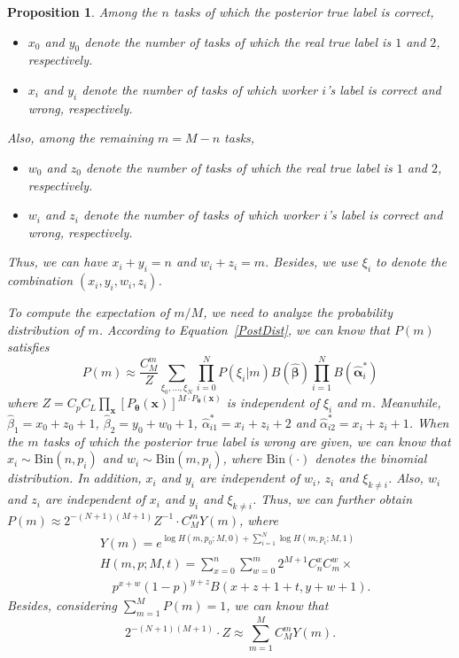 \documentclass{article}
\makeatletter
\newtheorem{proposition}[theorem]{Proposition}
\renewenvironment{proof}[1][\proofname]{\par
  \vspace{-\topsep}%
  \pushQED{\qed}%
  \normalfont
  \topsep0pt \partopsep0pt %
  \trivlist
  \item[\hskip\labelsep
        \itshape
    #1\@addpunct{.}]\ignorespaces
}{%
  \popQED\endtrivlist\@endpefalse
  \addvspace{0pt plus 0pt} %
}
\makeatother
\begin{document}
\begin{proposition}
\begin{proof}
Among the $n$ tasks of which the posterior true label is correct,
\begin{itemize}[noitemsep,topsep=0pt]
\item $x_0$ and $y_0$ denote the number of tasks of which the real true label is $1$ and $2$, respectively.
\item $x_i$ and $y_i$ denote the number of tasks of which worker $i$'s label is correct and wrong, respectively.
\end{itemize}
Also, among the remaining $m=M-n$ tasks, 
\begin{itemize}[noitemsep,topsep=0pt]
\item $w_0$ and $z_0$ denote the number of tasks of which the real true label is $1$ and $2$, respectively.
\item $w_i$ and $z_i$ denote the number of tasks of which worker $i$'s label is correct and wrong, respectively.
\end{itemize}
Thus, we can have $x_i+y_i=n$ and $w_i+z_i=m$. Besides, we use $\xi_i$ to denote the combination $(x_i,y_i,w_i, z_i)$.

To compute the expectation of $m/M$, we need to analyze the probability distribution of $m$. According to Equation~\ref{PostDist}, we can know that $P(m)$ satisfies
\begin{equation}
P(m) \approx \frac{C_{M}^{m}}{Z} \sum_{\xi_0,\ldots, \xi_N}\prod_{i=0}^{N}P(\xi_i|m) B(\hat{\bm{\beta}})\prod_{i=1}^{N}B(\hat{\bm{\alpha}}^{*}_{i})
\end{equation}
where $Z=C_pC_L{\prod}_{\bm{x}} [P_{\bm{\theta}}(\bm{x})]^{M\cdot P_{\bm{\theta}}(\bm{x})}$ is independent of $\xi_i$ and $m$.
Meanwhile, $\hat{\beta}_1=x_0+z_0+1$, $\hat{\beta}_2=y_0+w_0+1$, $\hat{\alpha}_{i1}^{*}=x_i+z_i+2$ and $\hat{\alpha}_{i2}^{*}=x_i+z_i+1$.
When the $m$ tasks of which the posterior true label is wrong are given, we can know that $x_i\sim \mathrm{Bin}(n, p_i)$ and $w_i\sim \mathrm{Bin}(m, p_i)$, where $\mathrm{Bin}(\cdot)$ denotes the binomial distribution.
In addition, $x_i$ and $y_i$ are independent of $w_i$, $z_i$ and $\xi_{k\neq i}$.
Also, $w_i$ and $z_i$ are independent of $x_i$ and $y_i$ and $\xi_{k\neq i}$.
Thus, we can further obtain $P(m)\approx 2^{-(N+1)(M+1)}Z^{-1}\cdot C_{M}^{m}Y(m)$, where
\begin{equation}
\label{PDist}
\begin{split}
&Y(m) =e^{\log H(m,p_0;M,0)+\sum_{i=1}^{N}\log H(m,p_i;M,1)}\\
&H(m,p;M,t)={\sum}_{x=0}^{n}{\sum}_{w=0}^{m} 2^{M+1}C_{n}^{x}C_{m}^{w}\times\\
&\quad p^{x+w}(1-p)^{y+z}B(x+z+1+t,y+w+1).
\end{split}
\end{equation}
Besides, considering $\sum_{m=1}^{M} P(m)=1$, we can know that
\begin{equation}
2^{-(N+1)(M+1)}\cdot Z\approx{\sum}_{m=1}^{M}C_{M}^{m}Y(m).
\end{equation}


\end{proof}
\end{proposition}
\end{document}
